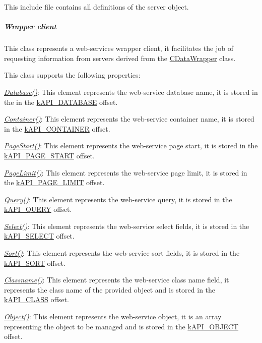 This include file contains all definitions of the server object. \subparagraph*{Wrapper client}

This class represents a web-\/services wrapper client, it facilitates the job of requesting information from servers derived from the \hyperlink{class_c_data_wrapper}{C\-Data\-Wrapper} class.

This class supports the following properties\-:


\begin{DoxyItemize}
\item {\itshape \hyperlink{}{Database()}}\-: This element represents the web-\/service database name, it is stored in the in the \hyperlink{}{k\-A\-P\-I\-\_\-\-D\-A\-T\-A\-B\-A\-S\-E} offset. 
\item {\itshape \hyperlink{}{Container()}}\-: This element represents the web-\/service container name, it is stored in the \hyperlink{}{k\-A\-P\-I\-\_\-\-C\-O\-N\-T\-A\-I\-N\-E\-R} offset. 
\item {\itshape \hyperlink{}{Page\-Start()}}\-: This element represents the web-\/service page start, it is stored in the \hyperlink{}{k\-A\-P\-I\-\_\-\-P\-A\-G\-E\-\_\-\-S\-T\-A\-R\-T} offset. 
\item {\itshape \hyperlink{}{Page\-Limit()}}\-: This element represents the web-\/service page limit, it is stored in the \hyperlink{}{k\-A\-P\-I\-\_\-\-P\-A\-G\-E\-\_\-\-L\-I\-M\-I\-T} offset. 
\item {\itshape \hyperlink{}{Query()}}\-: This element represents the web-\/service query, it is stored in the \hyperlink{}{k\-A\-P\-I\-\_\-\-Q\-U\-E\-R\-Y} offset. 
\item {\itshape \hyperlink{}{Select()}}\-: This element represents the web-\/service select fields, it is stored in the \hyperlink{}{k\-A\-P\-I\-\_\-\-S\-E\-L\-E\-C\-T} offset. 
\item {\itshape \hyperlink{}{Sort()}}\-: This element represents the web-\/service sort fields, it is stored in the \hyperlink{}{k\-A\-P\-I\-\_\-\-S\-O\-R\-T} offset. 
\item {\itshape \hyperlink{}{Classname()}}\-: This element represents the web-\/service class name field, it represents the class name of the provided object and is stored in the \hyperlink{}{k\-A\-P\-I\-\_\-\-C\-L\-A\-S\-S} offset. 
\item {\itshape \hyperlink{}{Object()}}\-: This element represents the web-\/service object, it is an array representing the object to be managed and is stored in the \hyperlink{}{k\-A\-P\-I\-\_\-\-O\-B\-J\-E\-C\-T} offset. 
\end{DoxyItemize}

